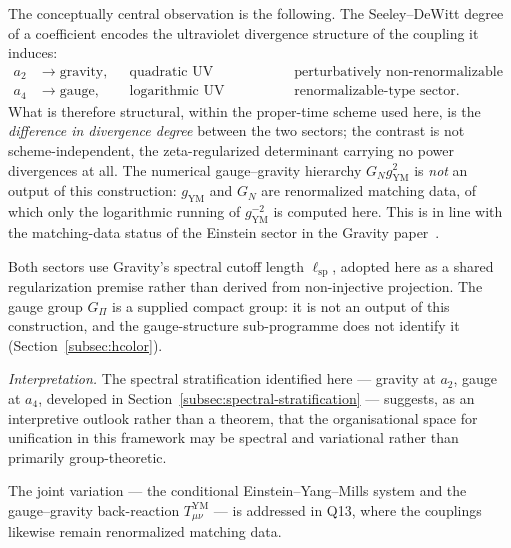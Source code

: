 \documentclass[12pt,a4paper]{article}
\theoremstyle{remark}
\theoremstyle{plain}
\theoremstyle{definition}
\begin{document}
    The conceptually central observation is the following.
    The Seeley--DeWitt degree of a coefficient encodes the
    ultraviolet divergence structure of the coupling it induces:
    \begin{align*}
      a_2 &\;\longrightarrow\; \text{gravity,}
      &&\text{quadratic UV divergence,}
      &&\text{perturbatively non-renormalizable sector,} \\
      a_4 &\;\longrightarrow\; \text{gauge,}
      &&\text{logarithmic UV divergence,}
      &&\text{renormalizable-type sector.}
    \end{align*}
    What is therefore structural, within the proper-time scheme used here, is the
    \emph{difference in divergence degree} between the two sectors; the contrast is not
    scheme-independent, the zeta-regularized determinant carrying no power divergences at all.
    The numerical gauge--gravity hierarchy $G_N g_{\mathrm{YM}}^2$ is
    \emph{not} an output of this construction: $g_{\mathrm{YM}}$ and
    $G_N$ are renormalized matching data, of which only the
    logarithmic running of $g_{\mathrm{YM}}^{-2}$ is computed here.
    This is in line with the matching-data status of the Einstein sector in the Gravity
    paper~\cite{Beau2026h}.

    Both sectors use Gravity's spectral cutoff length $\ell_{\mathrm{sp}}$,
    adopted here as a shared regularization premise rather than derived from
    non-injective projection.
    The gauge group $G_\Pi$ is a supplied compact group: it is not an output of this
    construction, and the gauge-structure sub-programme does not identify it
    (Section~\ref{subsec:hcolor}).

    \emph{Interpretation.} The spectral stratification identified
    here --- gravity at $a_2$, gauge at $a_4$, developed in
    Section~\ref{subsec:spectral-stratification} --- suggests, as an
    interpretive outlook rather than a theorem, that the
    organisational space for unification in this framework may be
    spectral and variational rather than primarily group-theoretic.

    The joint variation --- the conditional Einstein--Yang--Mills system and the
    gauge--gravity back-reaction $T^{\mathrm{YM}}_{\mu\nu}$ --- is addressed in Q13, where the
    couplings likewise remain renormalized matching data.

    \newpage
    
    
\end{document}
